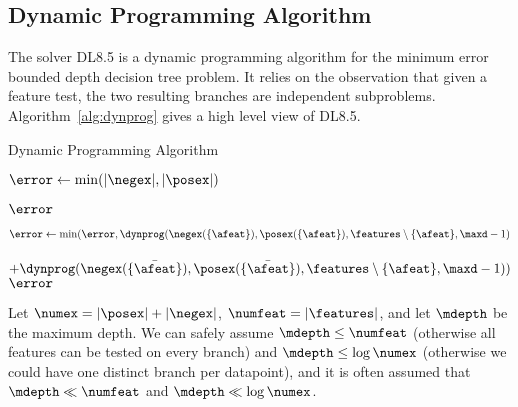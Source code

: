 \documentclass{llncs}
\begin{document}
\subsection{Dynamic Programming Algorithm}

The solver DL8.5 is a dynamic programming algorithm for the minimum error bounded depth decision tree problem. It relies on the observation that given a feature test, the two resulting branches are independent subproblems. Algorithm~\ref{alg:dynprog} gives a high level view of DL8.5.


	
	\begin{algorithm}
		\caption{Dynamic Programming Algorithm\label{alg:dynprog}}
		\TitleOfAlgo{\dynprog}
		  \KwData{$\negex,\posex,\features,\maxd$}
			$\error \gets \min(|\negex|,|\posex|)$\;
			
			 {
			\Return $\error$
			}
			
			\ForEach{$\afeat \in \features$} {
					$\error \gets \min(\error, \dynprog(\negex(\{\afeat\}),\posex(\{\afeat\}),\features \setminus \{\afeat\},\maxd-1)$\;
					\ \ \ \ \ \ \ \ \ \ \ \ \ \ \ \ \ \ \ \ \ \ \ \  $ + \dynprog(\negex(\{\bar{\afeat}\}),\posex(\{\bar{\afeat}\}),\features \setminus \{\afeat\},\maxd-1))$\;
			}
			\Return $\error$\;
	\end{algorithm}
	
	
	Let $\numex = |\posex| + |\negex|$, $\numfeat = |\features|$, and let $\mdepth$ be the maximum depth.
	We can safely assume $\mdepth \leq \numfeat$ (otherwise all features can be tested on every branch) and $\mdepth \leq \log \numex$ (otherwise we could have one distinct branch per datapoint), and it is often assumed that
	 $\mdepth \ll \numfeat$ and $\mdepth \ll \log \numex$. 
	 
\end{document}
